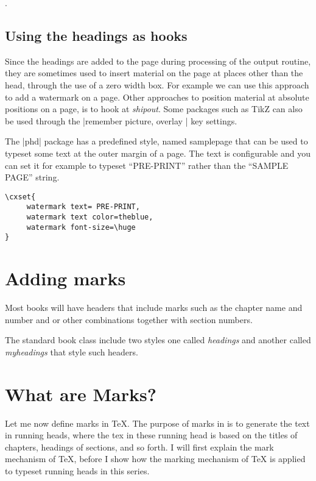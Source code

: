 . 



\subsection{Using the headings as hooks}

Since the headings are added to the page during processing of the output routine, they are sometimes used
to insert material on the page at places other than the head, through the use of a zero width box. For example we
can use this approach to add a watermark on a page. Other approaches to position material at absolute positions
on a page, is to hook at \emph{shipout}. Some packages such as TikZ can also be used through the |remember picture, overlay |  key settings. 

The |phd| package has a predefined style, named samplepage that can be used to typeset some text at the outer margin of a page. The text is configurable and you can set it for example to typeset “PRE-PRINT” rather than the “SAMPLE PAGE” string. 

\begin{tcolorbox}
\begin{lstlisting}
\cxset{
     watermark text= PRE-PRINT,
     watermark text color=theblue,
     watermark font-size=\huge
}
\end{lstlisting}
\end{tcolorbox}

\makeatletter
{}
\makeatother

   
\thispagestyle{samplepage}


\section{Adding marks}

Most books will have headers that include marks such as the chapter name and number and or other combinations together with section numbers.

The standard book class include two styles one called \textit{headings} and another called \textit{myheadings} that style such headers.


\section{What are Marks?}

Let me now define marks in TeX. The purpose of marks in \tex is to generate 
the text in running heads, where the tex in these running head is based on the 
titles of chapters, headings of sections, and so forth. I will first explain the mark 
mechanism of TeX, before I show how the marking mechanism of TeX is applied 
to typeset running heads in this series. 


